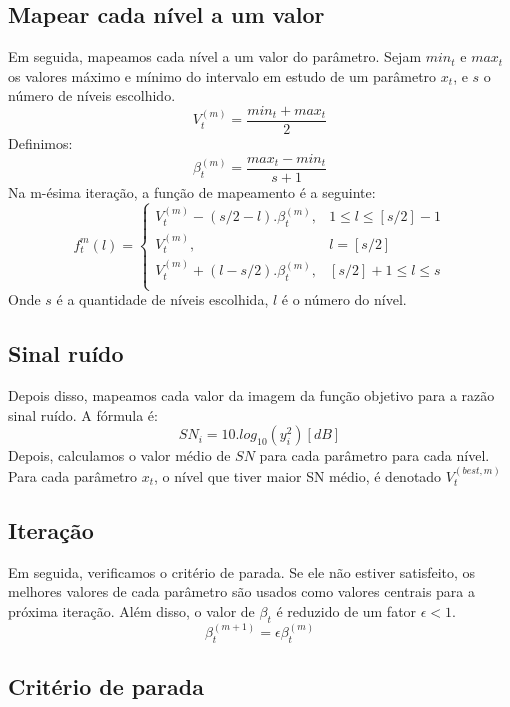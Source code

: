 \documentclass[]{politex}
\begin{document}
\subsection{Mapear cada nível a um valor}
Em seguida, mapeamos cada nível a um valor do parâmetro. Sejam $min_t$ e $max_t$
os valores máximo e mínimo do intervalo em estudo de um parâmetro $x_t$, e $s$ o
número de níveis escolhido. 
\begin{equation*}
    V_t^{(m)}=\frac{min_t+max_t}{2}
\end{equation*}
Definimos:
\begin{equation*}
    \beta_t^{(m)} = \frac{max_t-min_t}{s+1}
\end{equation*}
Na m-ésima iteração, a função de mapeamento é a seguinte:
\begin{equation*}
    f_t^m(l) =     
    \begin{cases}
        V_t^{(m)} - (s/2 - l).\beta_t^{(m)}, & 1 \leq l \leq [s/2] - 1 \\
        V_t^{(m)}, &  l = [s/2]\\
        V_t^{(m)} + (l - s/2).\beta_t^{(m)}, & [s/2] + 1 \leq l \leq s \\
    \end{cases}
\end{equation*}
Onde $s$ é a quantidade de níveis escolhida, $l$ é o número do nível.
\subsection{Sinal ruído}
Depois disso, mapeamos cada valor da imagem da função objetivo para a razão 
sinal ruído. A fórmula é:
\begin{equation*}
    SN_i = 10.log_{10}(y_i^2) [dB]
\end{equation*}
Depois, calculamos o valor médio de $SN$ para cada parâmetro para cada nível.
Para cada parâmetro $x_t$, o nível que tiver maior SN médio, é denotado 
$V_t^{(best, m)}$
\subsection{Iteração}
Em seguida, verificamos o critério de parada. Se ele não estiver satisfeito, os
melhores valores de cada parâmetro são usados como valores centrais para a
próxima iteração. Além disso, o valor de $\beta_t$ é reduzido de um fator $\epsilon < 1$.
\begin{equation*}
    \beta_t^{(m+1)} = \epsilon\beta_t^{(m)}
\end{equation*}
\subsection{Critério de parada}
\end{document}
